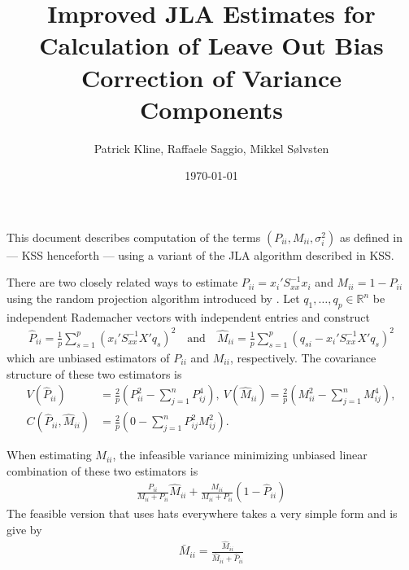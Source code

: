 \documentclass[letterpaper,12pt]{article}
\theoremstyle{remark}
\theoremstyle{definition}
\theoremstyle{plain}
\newcommand\inverse{^{-1}}
\newcommand{\R}{\mathbb{R}}
\begin{document}
\baselineskip20pt

\title{Improved JLA Estimates for Calculation of Leave Out Bias Correction of Variance Components}
\author{Patrick Kline, Raffaele Saggio, Mikkel S\o lvsten}

\date{\today}
\maketitle

This document describes computation of the terms $(P_{ii},M_{ii},\sigma_{i}^{2})$ as defined in \cite*{kline2020leave} --- KSS henceforth ---  using a variant of the JLA algorithm described in KSS.  

There are two closely related ways to estimate $P_{ii} = x_i'S_{xx}\inverse x_i$ and $M_{ii} =1-P_{ii}$ using the random projection algorithm introduced by \cite{achlioptas2001database}. Let $q_1,\dots,q_p \in \R^n$ be independent Rademacher vectors with independent entries and construct
\begin{align}
	\hat P_{ii} = \frac{1}{p} \sum_{s=1}^p (x_i'S_{xx}\inverse X'q_s)^2
	\quad \text{and} \quad
	\hat M_{ii} = \frac{1}{p} \sum_{s=1}^p (q_{si} - x_i'S_{xx}\inverse X'q_s)^2
\end{align}
which are unbiased estimators of $P_{ii}$ and $M_{ii}$, respectively. The covariance structure of these two estimators is
\begin{align}
V(\hat P_{ii}) &= \frac{2}{p}\left(P_{ii}^2 - \sum_{j=1}^n P_{ij}^4\right), \
V(\hat M_{ii}) = \frac{2}{p}\left(M_{ii}^2 - \sum_{j=1}^n M_{ij}^4\right), \\
C(\hat P_{ii},\hat M_{ii}) &= \frac{2}{p}\left(0 - \sum_{j=1}^n P_{ij}^2 M_{ij}^2\right).
\end{align}

When estimating $M_{ii}$, the infeasible variance minimizing unbiased linear combination of these two estimators is
\begin{align}
\frac{P_{ii}}{M_{ii} + P_{ii}} \hat M_{ii} + \frac{M_{ii}}{M_{ii} + P_{ii}} (1-\hat P_{ii})
\end{align}
The feasible version that uses hats everywhere takes a very simple form and is give by
\begin{align}\label{eq:kicksass}
	\bar M_{ii} = \frac{\hat M_{ii}}{\hat M_{ii} + \hat P_{ii}}
\end{align}
\end{document}
